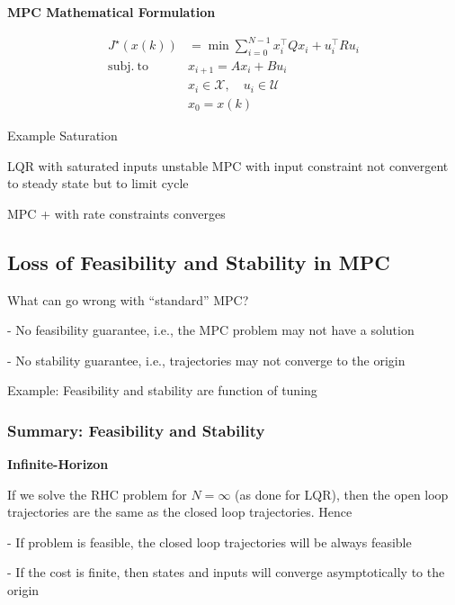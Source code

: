 \begin{sstTitleBox}[ForestGreen]{\textbf{\large
			MPC Mathematical Formulation
		}}

	\[\begin{aligned}
			J^\star(x(k))         & = \min \textstyle\sum_{i=0}^{N-1}
			x_i^\top Q x_i + u_i^\top R u_i                                        \\
			\mathrm{subj.\ to }\  & x_{i+1} = Ax_i + Bu_i                          \\
			                      & x_i \in \mathcal{X}, \quad u_i \in \mathcal{U} \\
			                      & x_0 = x(k)
		\end{aligned}\]

\end{sstTitleBox}

Example Saturation

LQR with saturated inputs unstable
MPC with input constraint not convergent to steady state but to limit cycle

MPC + with rate constraints converges

\subsection{Loss of Feasibility and Stability in MPC}

What can go wrong with “standard” MPC?

- No feasibility guarantee, i.e., the MPC problem may not have a solution

- No stability guarantee, i.e., trajectories may not converge to the origin

Example: Feasibility and stability are function of tuning

\subsubsection{Summary: Feasibility and Stability}

\textbf{Infinite-Horizon}

If we solve the RHC problem for $N = \infty$ (as done for LQR), then the
open loop trajectories are the same as the closed loop trajectories. Hence

- If problem is feasible, the closed loop trajectories will be always feasible

- If the cost is finite, then states and inputs will converge asymptotically to
the origin


